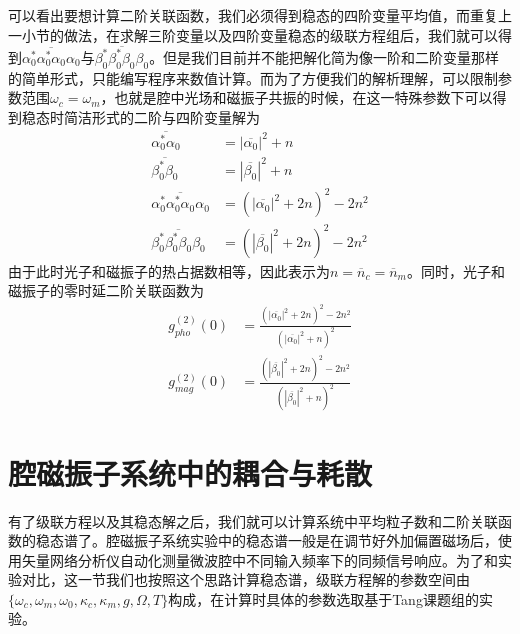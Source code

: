 可以看出要想计算二阶关联函数，我们必须得到稳态的四阶变量平均值，而重复上一小节的做法，在求解三阶变量以及四阶变量稳态的级联方程组后，我们就可以得到$\overline{\alpha_{0}^{*}\alpha_{0}^{*}\alpha_{0}\alpha_{0}}$与$\overline{\beta_{0}^{*}\beta_{0}^{*}\beta_{0}\beta_{0}}$。但是我们目前并不能把解化简为像一阶和二阶变量那样的简单形式，只能编写程序来数值计算。而为了方便我们的解析理解，可以限制参数范围$\omega_{c}=\omega_{m}$，也就是腔中光场和磁振子共振的时候，在这一特殊参数下可以得到稳态时简洁形式的二阶与四阶变量解为
\begin{align}
\overline{\alpha_{0}^{*}\alpha_{0}}&=|\overline{\alpha_{0}}|^{2}+n \\
\overline{\beta_{0}^{*}\beta_{0}}&=|\overline{\beta_{0}}|^{2}+n \\
\overline{\alpha_{0}^{*}\alpha_{0}^{*}\alpha_{0}\alpha_{0}}&=(|\overline{\alpha_{0}}|^{2}+2n)^2-2n^2 \\
\overline{\beta_{0}^{*}\beta_{0}^{*}\beta_{0}\beta_{0}}&=(|\overline{\beta_{0}}|^{2}+2n)^2-2n^2
\end{align}
由于此时光子和磁振子的热占据数相等，因此表示为$n=\overline{n}_{c}=\overline{n}_{m}$。同时，光子和磁振子的零时延二阶关联函数为
\begin{align}
g_{pho}^{(2)}(0) &  =\frac{(|\overline{\alpha_{0}}|^{2}+2n)^2-2n^2}{(|\overline{\alpha_{0}}|^{2}+n)^2} \label{g2pho} \\
g_{mag}^{(2)}(0) &  =\frac{(|\overline{\beta_{0}}|^{2}+2n)^2-2n^2}{(|\overline{\beta_{0}}|^{2}+n)^2} \label{g2mag}
\end{align}

\newlength{\basefigurewidth}
\setlength{\basefigurewidth}{0.33\textwidth}

\section{腔磁振子系统中的耦合与耗散}
有了级联方程以及其稳态解之后，我们就可以计算系统中平均粒子数和二阶关联函数的稳态谱了。腔磁振子系统实验中的稳态谱一般是在调节好外加偏置磁场后，使用矢量网络分析仪自动化测量微波腔中不同输入频率下的同频信号响应\cite{PhysRevB.99.134445Hu}。为了和实验对比，这一节我们也按照这个思路计算稳态谱，级联方程解的参数空间由$\{ \omega_c,\omega_m,\omega_0,\kappa_c,\kappa_m,g,\Omega,T \}$构成，在计算时具体的参数选取基于Tang课题组的实验\cite{PhysRevLett.113.156401Tang}。

